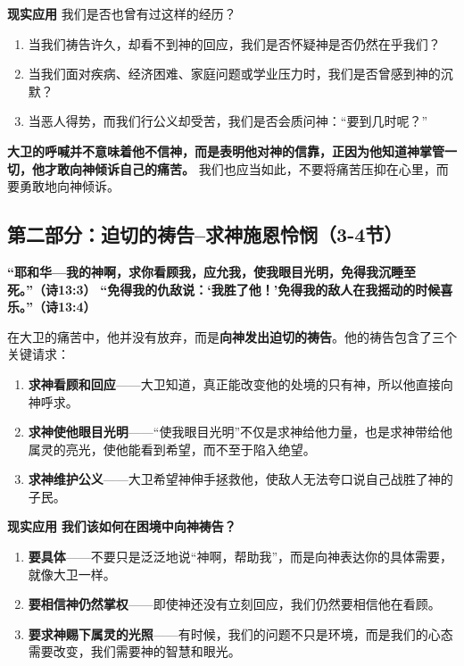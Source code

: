 \documentclass[a4paper, 12pt]{article}
\begin{document}
\vspace{0.2cm}

\textbf{现实应用} 我们是否也曾有过这样的经历？

\begin{enumerate}
    \item 当我们祷告许久，却看不到神的回应，我们是否怀疑神是否仍然在乎我们？
    \item 当我们面对疾病、经济困难、家庭问题或学业压力时，我们是否曾感到神的沉默？
    \item 当恶人得势，而我们行公义却受苦，我们是否会质问神：“要到几时呢？”
\end{enumerate}


\textbf{大卫的呼喊并不意味着他不信神，而是表明他对神的信靠，正因为他知道神掌管一切，他才敢向神倾诉自己的痛苦。} 我们也应当如此，不要将痛苦压抑在心里，而要勇敢地向神倾诉。  


\subsection*{第二部分：迫切的祷告--求神施恩怜悯（3-4节）}

\hspace{0.4cm}\textbf{“耶和华—我的神啊，求你看顾我，应允我，使我眼目光明，免得我沉睡至死。”（诗13:3）}  
\textbf{“免得我的仇敌说：‘我胜了他！’免得我的敌人在我摇动的时候喜乐。”（诗13:4）  }

\vspace{0.2cm}

在大卫的痛苦中，他并没有放弃，而是\textbf{向神发出迫切的祷告}。他的祷告包含了三个关键请求：  

\begin{enumerate}
    \item \textbf{求神看顾和回应}——大卫知道，真正能改变他的处境的只有神，所以他直接向神呼求。  
    \item \textbf{求神使他眼目光明}——“使我眼目光明”不仅是求神给他力量，也是求神带给他属灵的亮光，使他能看到希望，而不至于陷入绝望。
    \item \textbf{求神维护公义}——大卫希望神伸手拯救他，使敌人无法夸口说自己战胜了神的子民。  
\end{enumerate}


\textbf{现实应用}  
\textbf{我们该如何在困境中向神祷告？}

\begin{enumerate}
    \item \textbf{要具体}——不要只是泛泛地说“神啊，帮助我”，而是向神表达你的具体需要，就像大卫一样。 
    \item \textbf{要相信神仍然掌权}——即使神还没有立刻回应，我们仍然要相信他在看顾。  
    \item \textbf{要求神赐下属灵的光照}——有时候，我们的问题不只是环境，而是我们的心态需要改变，我们需要神的智慧和眼光。  
\end{enumerate}
\end{document}
